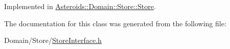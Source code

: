 Implemented in \hyperlink{classAsteroids_1_1Domain_1_1Store_1_1Store_a6263ac0a86f49fb2ddf89c93d7cf9015}{Asteroids\+::\+Domain\+::\+Store\+::\+Store}.



The documentation for this class was generated from the following file\+:\begin{DoxyCompactItemize}
\item 
Domain/\+Store/\hyperlink{StoreInterface_8h}{Store\+Interface.\+h}\end{DoxyCompactItemize}

